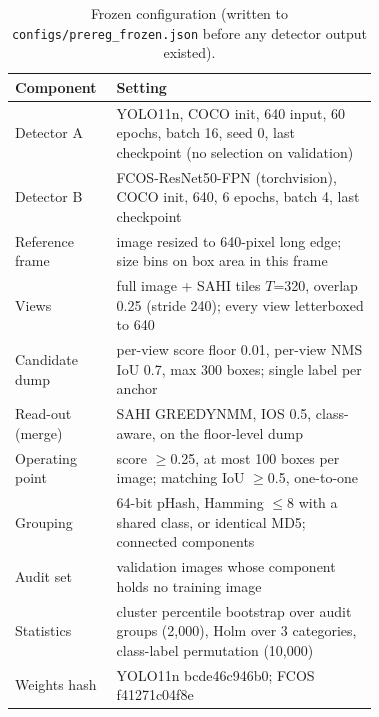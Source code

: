 \begin{table}[!htbp]
\centering
\scriptsize
\caption{Frozen configuration (written to \texttt{configs/prereg\_frozen.json} before any detector output existed).}
\label{tab:config}
\begin{tabular}{lp{0.72\linewidth}}
\toprule
Component & Setting \\
\midrule
Detector A & YOLO11n, COCO init, 640 input, 60 epochs, batch 16, seed 0, last checkpoint (no selection on validation) \\
Detector B & FCOS-ResNet50-FPN (torchvision), COCO init, 640, 6 epochs, batch 4, last checkpoint \\
Reference frame & image resized to 640-pixel long edge; size bins on box area in this frame \\
Views & full image + SAHI tiles $T$=320, overlap 0.25 (stride 240); every view letterboxed to 640 \\
Candidate dump & per-view score floor 0.01, per-view NMS IoU 0.7, max 300 boxes; single label per anchor \\
Read-out (merge) & SAHI GREEDYNMM, IOS 0.5, class-aware, on the floor-level dump \\
Operating point & score $\geq$0.25, at most 100 boxes per image; matching IoU $\geq$0.5, one-to-one \\
Grouping & 64-bit pHash, Hamming $\leq$8 with a shared class, or identical MD5; connected components \\
Audit set & validation images whose component holds no training image \\
Statistics & cluster percentile bootstrap over audit groups (2,000), Holm over 3 categories, class-label permutation (10,000) \\
Weights hash & YOLO11n bcde46c946b0; FCOS f41271c04f8e \\
\bottomrule
\end{tabular}
\end{table}
